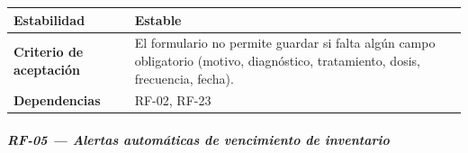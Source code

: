 \documentclass[
]{article}
\begin{document}
{\begin{longtable}[]{|
  >{\raggedright\arraybackslash}p{}|
  >{\raggedright\arraybackslash}p{}|}
\hline
\textbf{Estabilidad} & \begin{minipage}[t]{\linewidth}\raggedright
Estable
\end{minipage} \\
\hline
\textbf{Criterio de aceptación} &
\begin{minipage}[t]{\linewidth}\raggedright
El formulario no permite guardar si falta algún campo obligatorio (motivo, diagnóstico, tratamiento, dosis, frecuencia, fecha).
\end{minipage} \\
\hline
\textbf{Dependencias} & \begin{minipage}[t]{\linewidth}\raggedright
RF-02, RF-23
\end{minipage} \\
\hline
\end{longtable}
}

\subparagraph{RF-05 --- Alertas automáticas de vencimiento de inventario}\label{rf-05-alertas-autom-ticas-de-vencimiento-de-in}
\end{document}

